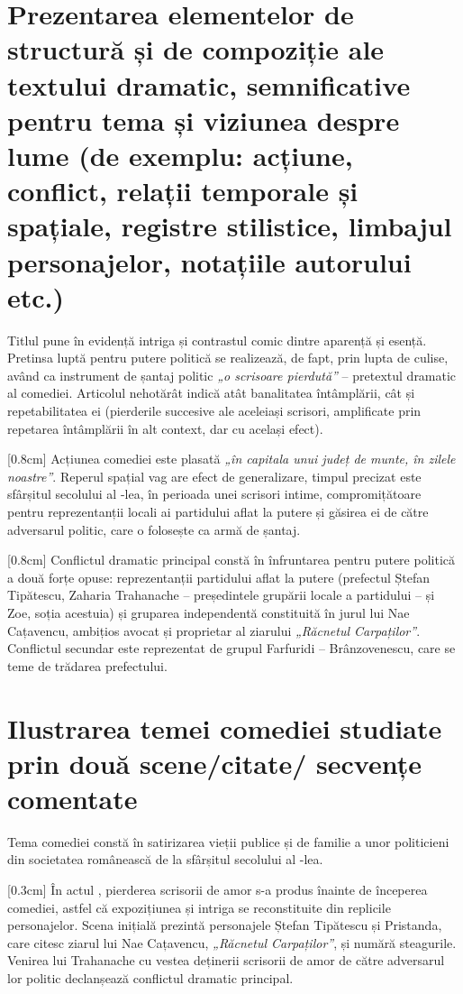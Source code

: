 \documentclass[
12pt,                        %
a4paper                      %
]{article}
\newcommand{\rom}[1]{\uppercase\expandafter{\romannumeral #1\relax}} %
\begin{document}
\section{Prezentarea elementelor de structură și de compoziție ale textului dramatic, semnificative pentru tema și viziunea despre lume {\footnotesize (de exemplu: acțiune, conflict, relații temporale și spațiale, registre stilistice, limbajul personajelor, notațiile autorului etc.)}}

Titlul pune în evidență intriga și contrastul comic dintre aparență și esență. Pretinsa luptă pentru putere politică se realizează, de fapt, prin lupta de culise, având ca instrument de șantaj politic \textit{„o scrisoare pierdută”} -- pretextul dramatic al comediei. Articolul nehotărât indică atât banalitatea întâmplării, cât și repetabilitatea ei (pierderile succesive ale aceleiași scrisori, amplificate prin repetarea întâmplării în alt context, dar cu același efect).

[0.8cm]
Acțiunea comediei este plasată \textit{„în capitala unui județ de munte, în zilele noastre”}. Reperul spațial vag are efect de generalizare, timpul precizat este sfârșitul secolului al \rom{19}-lea, în perioada unei scrisori intime, compromițătoare pentru reprezentanții locali ai partidului aflat la putere și găsirea ei de către adversarul politic, care o folosește ca armă de șantaj.

[0.8cm]
Conflictul dramatic principal constă în înfruntarea pentru putere politică a două forțe opuse: reprezentanții partidului aflat la putere (prefectul Ștefan Tipătescu, Zaharia Trahanache -- președintele grupării locale a partidului -- și Zoe, soția acestuia) și gruparea independentă constituită în jurul lui Nae Cațavencu, ambițios avocat și proprietar al ziarului \textit{„Răcnetul Carpaților”}. Conflictul secundar este reprezentat de grupul Farfuridi -- Brânzovenescu, care se teme de trădarea prefectului.

\section{Ilustrarea temei comediei studiate prin două sce\-ne/ci\-ta\-te/ sec\-ven\-țe comentate}

Tema comediei constă în satirizarea vieții publice și de familie a unor politicieni din societatea românească de la sfârșitul secolului al \rom{19}-lea.

[0.3cm]
În actul \rom{1}, pierderea scrisorii de amor s-a produs înainte de începerea comediei, astfel că expozițiunea și intriga se reconstituite din replicile personajelor. Scena inițială prezintă personajele Ștefan Tipătescu și Pristanda, care citesc ziarul lui Nae Cațavencu, \textit{„Răcnetul Carpaților”}, și numără steagurile. Venirea lui Trahanache cu vestea deținerii scrisorii de amor de către adversarul lor politic declanșează conflictul dramatic principal.
\end{document}

